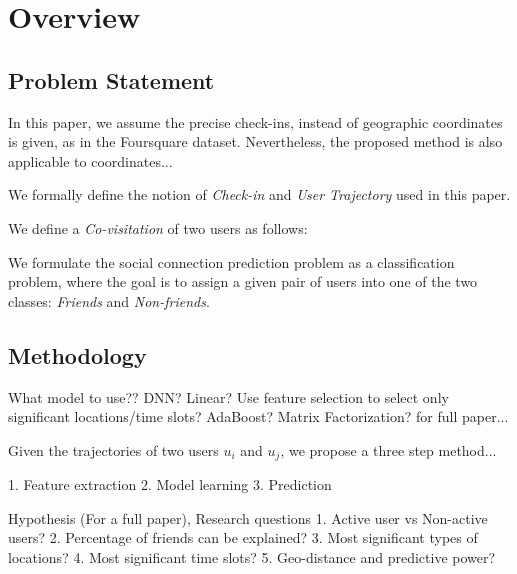 \section{Overview} \label{sec:overview}

\subsection{Problem Statement} \label{sec:problem}


In this paper, we assume the precise check-ins, instead of geographic coordinates is given, as in the Foursquare dataset. Nevertheless, the proposed method is also applicable to coordinates...


We formally define the notion of \textit{Check-in} and \textit{User Trajectory} used in this paper.




We define a \textit{Co-visitation} of two users as follows: 



We formulate the social connection prediction problem as a classification problem, where the goal is to assign a given pair of users into one of the two classes: \textit{Friends} and \textit{Non-friends}.


\subsection{Methodology} \label{sec:framework}

What model to use?? DNN? Linear? 
Use feature selection to select only significant locations/time slots? AdaBoost?
Matrix Factorization? for full paper...

Given the trajectories of two users $u_i$ and $u_j$, we propose a three step method...

1. Feature extraction
2. Model learning
3. Prediction



Hypothesis (For a full paper), Research questions
1. Active user vs Non-active users?
2. Percentage of friends can be explained? 
3. Most significant types of locations?
4. Most significant time slots?
5. Geo-distance and predictive power?